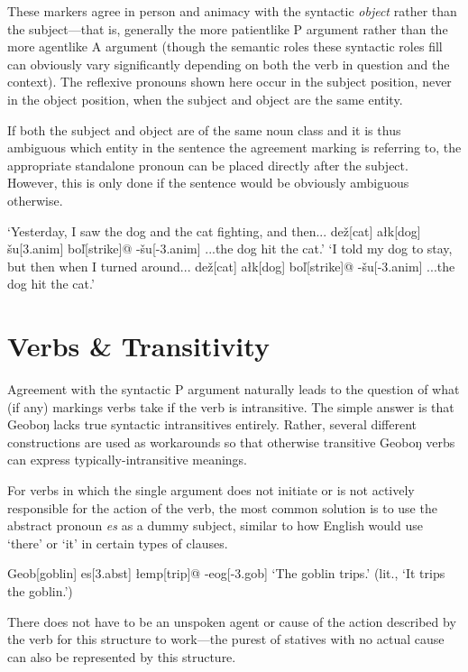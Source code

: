 \documentclass[a4paper,11pt,oneside,openany]{memoir}
\newcommand{\vz}{ž}
\newcommand{\vs}{š}
\newcommand{\vl}{ľ}
\begin{document}
These markers agree in person and animacy with the syntactic \emph{object} rather than the subject---that is, generally the more patientlike P argument rather than the more agentlike A argument (though the semantic roles these syntactic roles fill can obviously vary significantly depending on both the verb in question and the context). The reflexive pronouns shown here occur in the subject position, never in the object position, when the subject and object are the same entity.

If both the subject and object are of the same noun class and it is thus ambiguous which entity in the sentence the agreement marking is referring to, the appropriate standalone pronoun can be placed directly after the subject. However, this is only done if the sentence would be obviously ambiguous otherwise.

\pex
\a
\begingl
\glpreamble
`Yesterday, I saw the dog and the cat fighting, and then...
\endpreamble
de{\vz}[cat]
a\l k[dog]
\vs u[\sc 3.anim]
bo\vl[strike]@
-\vs u[\sc -3.anim]
\glft ...the dog hit the cat.'
\endgl
\a 
\begingl
\glpreamble
`I told my dog to stay, but then when I turned around...
\endpreamble
de{\vz}[cat]
a\l k[dog]
bo\vl[strike]@
-\vs u[\sc -3.anim]
\glft ...the dog hit the cat.'
\endgl
\xe

\section{Verbs \& Transitivity}

Agreement with the syntactic P argument naturally leads to the question of what (if any) markings verbs take if the verb is intransitive. The simple answer is that Geoboŋ lacks true syntactic intransitives entirely. Rather, several different constructions are used as workarounds so that otherwise transitive Geoboŋ verbs can express typically-intransitive meanings.

For verbs in which the single argument does not initiate or is not actively responsible for the action of the verb, the most common solution is to use the abstract pronoun \textit{es} as a dummy subject, similar to how English would use `there' or `it' in certain types of clauses. 

\ex 
\begingl
Geob[goblin]
es[\sc 3.abst] 
\l emp[trip]@
-eog[\sc -3.gob]
\glft `The goblin trips.' (lit., `It trips the goblin.')
\endgl
\xe

There does not have to be an unspoken agent or cause of the action described by the verb for this structure to work---the purest of statives with no actual cause can also be represented by this structure.
\end{document}
